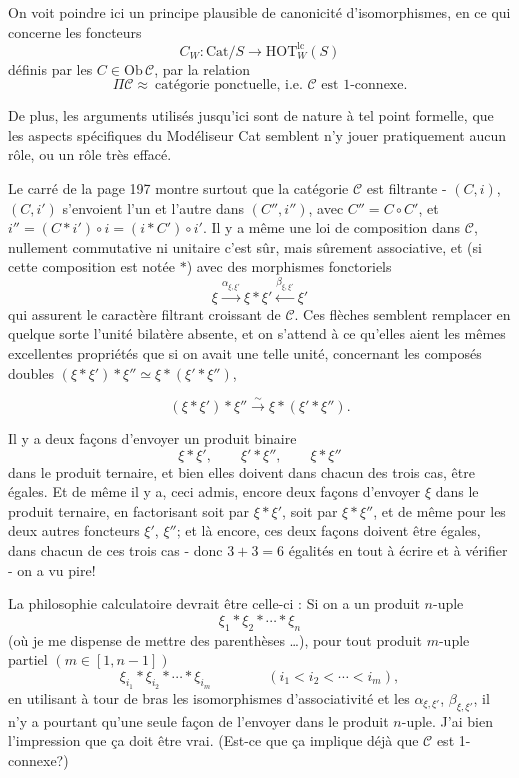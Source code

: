 \documentclass[11pt]{article}
\newcommand{\printedpage}[1]{{\reversemarginpar\marginnote{\raggedleft\scriptsize ed.~#1}}}
\newcommand{\msp}[1]{\marginpar{\raggedright\scriptsize ms.~#1}}
\newcommand{\Cat}{\mathrm{Cat}}
\newcommand{\HOT}{\mathrm{HOT}}
\begin{document}
On voit poindre ici un principe plausible de canonicité d'isomorphismes, en ce qui concerne les foncteurs
\[
C_W : \Cat/S \longrightarrow \HOT^{\mathrm{lc}}_W(S)
\]
définis par les $C \in \mathrm{Ob}\,\mathcal{C}$, par la relation
\[
\Pi\mathcal{C} \approx \ \text{catégorie ponctuelle, i.e. } \mathcal{C} \text{ est 1-connexe.}
\]

De plus, les arguments utilisés jusqu'ici sont de nature à tel point formelle, que les aspects spécifiques du Modéliseur Cat
\printedpage{132}
\msp{page 201}semblent n'y jouer pratiquement aucun rôle, ou un rôle très effacé.

Le carré de la page 197 montre surtout que la catégorie $\mathcal{C}$ est filtrante - $(C,i)$, $(C,i')$ s'envoient l'un et l'autre dans $(C'',i'')$, avec $C'' = C \circ C'$, et $i'' = (C * i') \circ i = (i * C') \circ i'$. Il y a même une loi de composition dans $\mathcal{C}$, nullement commutative ni unitaire c'est sûr, mais sûrement associative, et (si cette composition est notée $*$) avec des morphismes fonctoriels %
\[
\xi \xrightarrow{\alpha_{\xi,\xi'}} \xi * \xi' \xleftarrow{\beta_{\xi,\xi'}} \xi'
\]
qui assurent le caractère filtrant croissant de $\mathcal{C}$. Ces flèches semblent remplacer en quelque sorte l'unité bilatère absente, et on s'attend à ce qu'elles aient les mêmes excellentes propriétés que si on avait une telle unité, concernant les composés doubles $(\xi * \xi') * \xi'' \simeq \xi * (\xi' * \xi'')$,

\msp{page 202}
\[
(\xi * \xi') * \xi'' \xrightarrow{\sim} \xi * (\xi' * \xi'').
\]

Il y a deux façons d'envoyer un produit binaire
\[
\xi * \xi', \qquad \xi' * \xi'', \qquad \xi * \xi''
\]
dans le produit ternaire, et bien elles doivent dans chacun des trois cas, être égales. Et de même il y a, ceci admis, encore deux façons d'envoyer $\xi$ dans le produit ternaire, en factorisant soit par $\xi * \xi'$, soit par $\xi * \xi''$, et de même pour les deux autres foncteurs $\xi'$, $\xi''$; et là encore, ces deux façons doivent être égales, dans chacun de ces trois cas - donc $3 + 3 = 6$ égalités en tout à écrire et à vérifier - on a vu pire!

La philosophie calculatoire devrait être celle-ci : Si on a un produit $n$-uple
\[
\xi_1 * \xi_2 * \cdots * \xi_n
\]
(où je me dispense de mettre des parenthèses \dots), pour tout produit $m$-uple partiel $(m \in [1, n-1])$\msp{page 203}
\[
\xi_{i_1} * \xi_{i_2} * \cdots * \xi_{i_m} \qquad\qquad (i_1 < i_2 < \cdots < i_m),
\]
en utilisant à tour de bras les isomorphismes d'associativité et les $\alpha_{\xi,\xi'}$, $\beta_{\xi,\xi'}$, il n'y a pourtant qu'une seule façon de l'envoyer dans le produit $n$-uple. J'ai bien l'impression que ça doit être vrai. (Est-ce que ça implique déjà que $\mathcal{C}$ est 1-connexe?)
\end{document}
